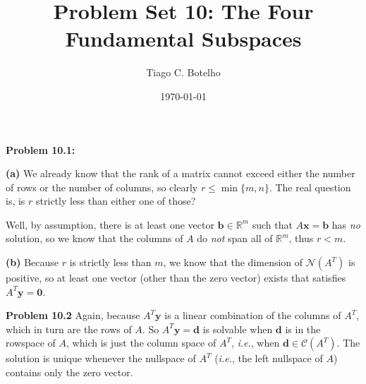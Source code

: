 \documentclass{article}
\title{Problem Set 10: The Four Fundamental Subspaces}
\author{Tiago C. Botelho}
\date{\today}
\begin{document}
\maketitle

\noindent \textbf{Problem 10.1:}

\noindent \textbf{(a)} We already know that the rank of a matrix cannot exceed either the number of rows or the number of columns, so clearly $r \leq \min\{m, n\}$. The real question is, is $r$ strictly less than either one of those?

Well, by assumption, there is at least one vector $\mathbf{b} \in \mathbb{R}^{m}$ such that $A\mathbf{x = b}$ has \textit{no} solution, so we know that the columns of $A$ do \textit{not} span all of $\mathbb{R}^{m}$, thus $r < m$.

\noindent \textbf{(b)} Because $r$ is strictly less than $m$, we know that the dimension of $\mathcal{N}(A^{T})$ is positive, so at least one vector (other than the zero vector) exists that satisfies $A^{T}\mathbf{y = 0}$.

\noindent \textbf{Problem 10.2} Again, because $A^{T}\mathbf{y}$ is a linear combination of the columns of $A^{T}$, which in turn are the rows of $A$. So $A^{T}\mathbf{y = d}$ is solvable when $\mathbf{d}$ is in the rowspace of $A$, which is just the column space of $A^{T}$, \textit{i.e.}, when $\mathbf{d} \in \mathcal{C}(A^{T})$. The solution is unique whenever the nullspace of $A^{T}$ (\textit{i.e.}, the left nullspace of $A$) contains only the zero vector. 
\end{document}
